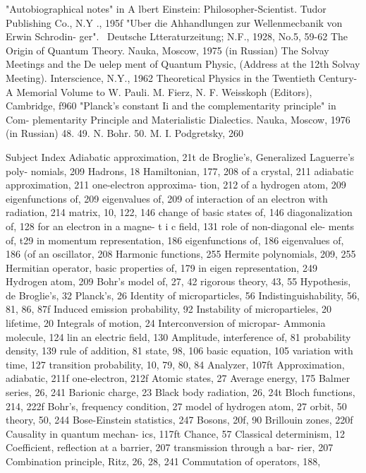 \documentclass[a4paper,sfsidenotes,colorlinks=true]{tufte-book}
\numberwithin{equation}{section}
\numberwithin{figure}{section}
\begin{document}
{{{{{{{"Autobiographical notes" in A lbert Einstein: Philosopher-Scientist. Tudor	Publishing	Co.,	N.Y .,	195f
"Uber die Ahhandlungen zur Wellenmecbanik von Erwin Schrodin- ger".~ Deutsche Ltteraturzeitung; N.F., 1928, No.5, 59-62
The Origin of Quantum Theory. Nauka, Moscow, 1975 (in Russian) The	Solvay	Meetings	and	the	De uelep ment	of	Quantum	Physic,
(Address at the 12th Solvay Meeting). Interscience, N.Y., 1962
Theoretical Physics in the Twentieth Century-A Memorial Volume to W. Pauli. M. Fierz, N. F. Weisskoph (Editors), Cambridge, f960
"Planck's constant Ii and the complementarity principle" in Com- plementarity Principle and Materialistic Dialectics. Nauka, Moscow, 1976 (in Russian)
48.
49.
N.	Bohr.
50. M. I. Podgretsky,
260

\cleardoublepage
Subject Index
Adiabatic approximation, 21t de Broglie's,
Generalized Laguerre's poly- nomials, 209
Hadrons, 18 Hamiltonian, 177, 208
of a crystal, 211 adiabatic	approximation,
211 one-electron approxima-
tion, 212 of a hydrogen atom, 209
eigenfunctions of, 209
eigenvalues of, 209 of interaction of an electron
with radiation, 214 matrix, 10, 122, 146
change of basic states of, 146
diagonalization of, 128 for an electron in a magne-
t i c	field,	131 role of non-diagonal ele- ments of, t29
in momentum representation, 186
eigenfunctions of, 186
eigenvalues of, 186 (of an oscillator, 208
Harmonic functions, 255 Hermite polynomials, 209, 255 Hermitian operator,
basic properties of, 179
in eigen representation, 249 Hydrogen atom, 209
Bohr's model of, 27, 42
rigorous theory, 43, 55 Hypothesis,
de Broglie's, 32 Planck's, 26
Identity of microparticles, 56 Indistinguishability, 56, 81, 86,
87f
Induced emission probability,
92
Instability of micropartieles, 20 lifetime, 20
Integrals of motion, 24 Interconversion of micropar-
Ammonia molecule, 124 lin an electric field, 130
Amplitude, interference of, 81 probability density, 139 rule of addition, 81 state, 98, 106
basic equation, 105
variation with time, 127 transition probability, 10, 79,
80, 84 Analyzer, 107ft
Approximation, adiabatic, 211f one-electron, 212f
Atomic states, 27 Average energy, 175
Balmer series, 26, 241 Barionic charge, 23 Black body radiation, 26, 24t Bloch functions, 214, 222f Bohr's,
frequency condition, 27 model of hydrogen atom, 27 orbit, 50 theory, 50, 244
Bose-Einstein statistics, 247 Bosons, 20f, 90 Brillouin zones, 220f
Causality in quantum mechan- ics, 117ft
Chance, 57 Classical determinism, 12 Coefficient,
reflection at a barrier, 207 transmission through a bar-
rier, 207 Combination principle, Ritz,
26, 28, 241 Commutation of operators, 188,
}}}}}}}
\end{document}
